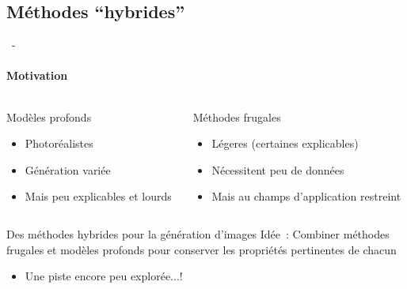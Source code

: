 \documentclass[aspectratio=169, 22pt]{beamer}
\begin{document}
\subsection{Méthodes ``hybrides''}
\begin{frame}{\secname~- \subsecname}
  \framesubtitle{Motivation} 
  \begin{columns}
    \pause
    \begin{column}{0.5\linewidth}
      \begin{block}{Modèles profonds}
        \begin{itemize}
        \item \small Photoréalistes
        \item \small Génération variée
        \item \small Mais peu explicables et lourds
        \end{itemize}
      \end{block}      
    \end{column}

    \pause
    \begin{column}{0.5\linewidth}
      \begin{customblock}{Méthodes frugales}
        \begin{itemize}
        \item \small Légeres (certaines explicables)
        \item \small Nécessitent peu de données
        \item \small Mais au champs d'application restreint
        \end{itemize}
      \end{customblock}      
    \end{column}    
  \end{columns}

  \vfill
  \pause
  \begin{exampleblock}{\centering Des méthodes hybrides pour la génération d'images}
    \centering
    \alert{Idée}~: Combiner méthodes frugales et modèles profonds pour
    conserver les propriétés pertinentes de chacun
  \end{exampleblock}
  \begin{itemize}
    \centering
    \item Une piste encore peu explorée...!
  \end{itemize}
\end{frame}
\end{document}
